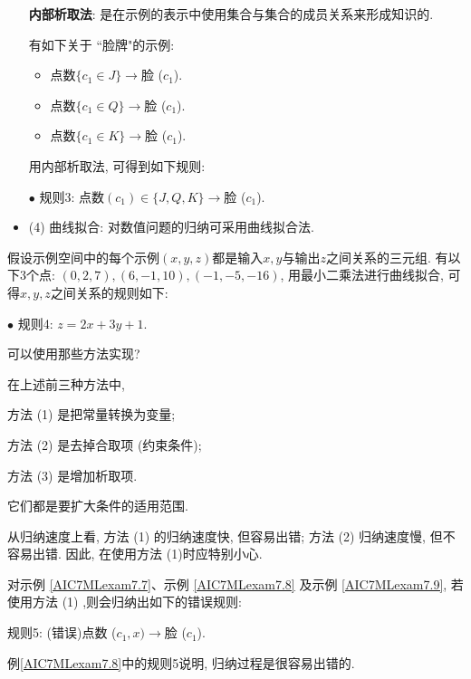 \begin{itemize}
 \textbf{内部析取法}: 是在示例的表示中使用集合与集合的成员关系来形成知识的.

\begin{example}\label{AIC7MLexam7.8}
有如下关于 ``脸牌"的示例:
\begin{itemize}
\item 点数$\{c_1\in {J}\}\rightarrow$脸 ($c_1$).
\item 点数$\{c_1\in {Q}\}\rightarrow$脸 ($c_1$).
\item 点数$\{c_1\in {K}\}\rightarrow$脸 ($c_1$).
\end{itemize}

用内部析取法, 可得到如下规则:
\begin{center}
    $\bullet$ 规则3: 点数$ (c_1)\in \{J, Q, K\}\rightarrow$脸 ($c_1$).
\end{center}
\vspace{-0.5cm}
\end{example}
\item (4) 曲线拟合: 对数值问题的归纳可采用曲线拟合法.
\end{itemize}

\begin{example}\label{AIC7MLexam7.9}
假设示例空间中的每个示例$ (x, y, z)$都是输入$x, y$与输出$z$之间关系的三元组.
有以下3个点: $ (0, 2, 7), (6, -1, 10), (-1, -5, -16)$, 用最小二乘法进行曲线拟合, 可得$x, y, z$之间关系的规则如下:

\begin{center}
    $\bullet$ 规则4: $z=2x+3y+1$.
\end{center}
可以使用那些方法实现?
\vspace{-0.5cm}
\end{example}
\begin{remark}
在上述前三种方法中,

方法 (1) 是把常量转换为变量;

方法 (2) 是去掉合取项 (约束条件);

方法 (3) 是增加析取项.

它们都是要扩大条件的适用范围.

从归纳速度上看, 方法 (1) 的归纳速度快, 但容易出错; 方法 (2) 归纳速度慢, 但不容易出错.
因此, 在使用方法 (1)时应特别小心.

\begin{example}\label{AIC7MLexam7.8}
对示例 \ref{AIC7MLexam7.7}、示例 \ref{AIC7MLexam7.8} 及示例  \ref{AIC7MLexam7.9}, 若使用方法 (1) ,则会归纳出如下的错误规则:

\begin{center}
    规则5: (错误)点数 ($c_1, x)\rightarrow$脸 ($c_1$).
\end{center}
\vspace{-0.3cm}
\end{example}
例\ref{AIC7MLexam7.8}中的规则5说明, 归纳过程是很容易出错的.
\end{remark}
